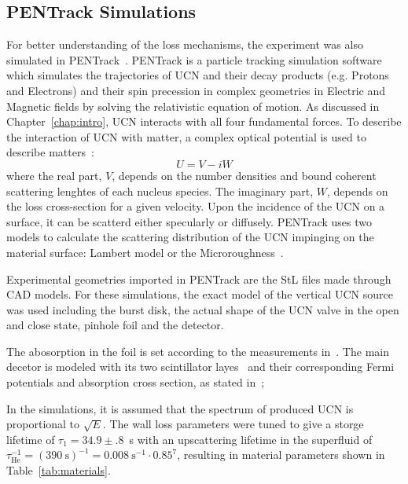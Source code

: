 \subsection{PENTrack Simulations\label{sec:pentrack}}

For better understanding of the loss mechanisms, the experiment was
also simulated in PENTrack~\cite{schreyer2017pentrack}. PENTrack is a
particle tracking simulation software which simulates the trajectories
of UCN and their decay products (e.g. Protons and Electrons) and their
spin precession in complex geometries in Electric and Magnetic fields
by solving the relativistic equation of motion. As discussed in
Chapter~\ref{chap:intro}, UCN interacts with all four fundamental forces. To
describe the interaction of UCN with matter, a complex optical
potential is used to describe matters~\cite{ucnbook}:
\begin{equation}
  \label{eqn:fermipotential}
  U = V - iW
\end{equation}
where the real part, $V$, depends on the number densities and bound
coherent scattering lenghtes of each nucleus species. The imaginary
part, $W$, depends on the loss cross-section for a given velocity.
Upon the incidence of the UCN on a surface, it can be scatterd either
specularly or diffusely. PENTrack uses two models to calculate the
scattering distribution of the UCN impinging on the material surface:
Lambert model or the Microroughness~\cite{Steyerl1972}.
  
Experimental geometries imported in PENTrack are the StL files made
through CAD models. For these simulations, the exact model of the
vertical UCN source was used including the burst disk, the actual
shape of the UCN valve in the open and close state, pinhole foil and
the detector. 

The abosorption in the foil is set according to the measurements
in~\cite{atchison2009transmission}. The main decetor is modeled with
its two scintillator layes~\cite{jamieson2017characterization} and
their corresponding Fermi potentials and absorption cross section, as
stated in~\cite{Ban2016};

In the simulations, it is assumed that the spectrum of produced UCN is
proportional to $\sqrt{E}$. The wall loss parameters were tuned to
give a storge lifetime of $\tau_1 = 34.9 \pm .8$~s with an
upscattering lifetime in the superfluid of
$\tau_{\mathrm{He}}^{-1} = (390~\mathrm{s})^{-1} =
0.008~\mathrm{s}^{-1}\cdot 0.85^{7}$, resulting in material parameters
shown in Table~\ref{tab:materials}.


